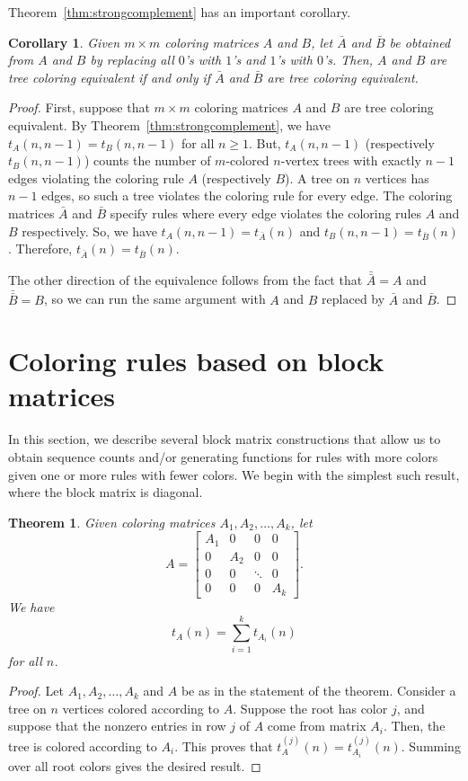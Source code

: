 \documentclass[12pt]{amsart}
\newtheorem{theorem}{Theorem}
\newtheorem{corollary}{Corollary}
\begin{document}
Theorem~\ref{thm:strongcomplement} has an important corollary.
\begin{corollary}\label{cor:complement}
    Given $m\times m$ coloring matrices $A$ and $B$, let $\bar{A}$ and $\bar{B}$ be obtained from $A$ and $B$ by replacing all $0$'s with $1$'s and $1$'s with $0$'s. Then, $A$ and $B$ are tree coloring equivalent if and only if $\bar{A}$ and $\bar{B}$ are tree coloring equivalent.
\end{corollary}
\begin{proof}
    First, suppose that $m\times m$ coloring matrices $A$ and $B$ are tree coloring equivalent. By Theorem~\ref{thm:strongcomplement}, we have $t_A(n,n-1)=t_B(n,n-1)$ for all $n\geq1$. But, $t_A(n,n-1)$ (respectively $t_B(n,n-1)$) counts the number of $m$-colored $n$-vertex trees with exactly $n-1$ edges violating the coloring rule $A$ (respectively $B$). A tree on $n$ vertices has $n-1$ edges, so such a tree violates the coloring rule for every edge. The coloring matrices $\bar{A}$ and $\bar{B}$ specify rules where every edge violates the coloring rules $A$ and $B$ respectively. So, we have $t_A(n,n-1)=t_{\bar{A}}(n)$ and $t_B(n,n-1)=t_{\bar{B}}(n)$. Therefore, $t_{\bar{A}}(n)=t_{\bar{B}}(n)$.

    The other direction of the equivalence follows from the fact that $\bar{\bar{A}}=A$ and $\bar{\bar{B}}=B$, so we can run the same argument with $A$ and $B$ replaced by $\bar{A}$ and $\bar{B}$.
\end{proof}


\section{Coloring rules based on block matrices}
\label{sec:new_from_old}
In this section, we describe several block matrix constructions that allow us to obtain sequence counts and/or generating functions for rules with more colors given one or more rules with fewer colors. We begin with the simplest such result, where the block matrix is diagonal.

\begin{theorem}\label{prop:blockdiag}
Given coloring matrices $A_1,A_2,\ldots,A_k$, let
\[
A=\left[\begin{array}{c|c|c|c}A_1&0&0&0\\\hline0&A_2&0&0\\\hline0&0&\ddots&0\\\hline0&0&0&A_k\end{array}\right].
\]
We have
\[
t_A(n)=\sum_{i=1}^kt_{A_i}(n)
\]
for all $n$.
\end{theorem}
\begin{proof}
    Let $A_1,A_2,\ldots,A_k$ and $A$ be as in the statement of the theorem. Consider a tree on $n$ vertices colored according to $A$. Suppose the root has color $j$, and suppose that the nonzero entries in row $j$ of $A$ come from matrix $A_i$. Then, the tree is colored according to $A_i$. This proves that $t_A^{(j)}(n)=t_{A_i}^{(j)}(n)$. Summing over all root colors gives the desired result.
\end{proof}
\end{document}
